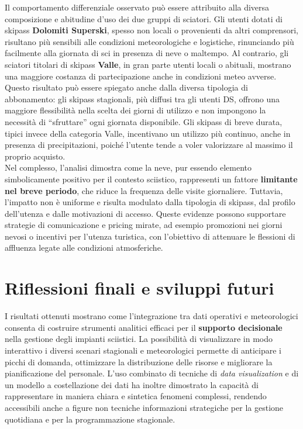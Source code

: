 Il comportamento differenziale osservato può essere attribuito alla diversa composizione e abitudine d’uso dei due gruppi di sciatori.  
Gli utenti dotati di skipass \textbf{Dolomiti Superski}, spesso non locali o provenienti da altri comprensori, risultano più sensibili alle condizioni meteorologiche e logistiche, rinunciando più facilmente alla giornata di sci in presenza di neve o maltempo.  
Al contrario, gli sciatori titolari di skipass \textbf{Valle}, in gran parte utenti locali o abituali, mostrano una maggiore costanza di partecipazione anche in condizioni meteo avverse.  
Questo risultato può essere spiegato anche dalla diversa tipologia di abbonamento: gli skipass stagionali, più diffusi tra gli utenti DS, offrono una maggiore flessibilità nella scelta dei giorni di utilizzo e non impongono la necessità di “sfruttare” ogni giornata disponibile.  
Gli skipass di breve durata, tipici invece della categoria Valle, incentivano un utilizzo più continuo, anche in presenza di precipitazioni, poiché l’utente tende a voler valorizzare al massimo il proprio acquisto.\\
Nel complesso, l’analisi dimostra come la neve, pur essendo elemento simbolicamente positivo per il contesto sciistico, rappresenti un fattore \textbf{limitante nel breve periodo}, che riduce la frequenza delle visite giornaliere.  
Tuttavia, l’impatto non è uniforme e risulta modulato dalla tipologia di skipass, dal profilo dell’utenza e dalle motivazioni di accesso.  
Queste evidenze possono supportare strategie di comunicazione e pricing mirate, ad esempio promozioni nei giorni nevosi o incentivi per l’utenza turistica, con l’obiettivo di attenuare le flessioni di affluenza legate alle condizioni atmosferiche.


\section{Riflessioni finali e sviluppi futuri}

I risultati ottenuti mostrano come l’integrazione tra dati operativi e meteorologici consenta di costruire strumenti analitici efficaci per il \textbf{supporto decisionale} nella gestione degli impianti sciistici.  
La possibilità di visualizzare in modo interattivo i diversi scenari stagionali e meteorologici permette di anticipare i picchi di domanda, ottimizzare la distribuzione delle risorse e migliorare la pianificazione del personale.  
L’uso combinato di tecniche di \textit{data visualization} e di un modello a costellazione dei dati ha inoltre dimostrato la capacità di rappresentare in maniera chiara e sintetica fenomeni complessi, rendendo accessibili anche a figure non tecniche informazioni strategiche per la gestione quotidiana e per la programmazione stagionale.

